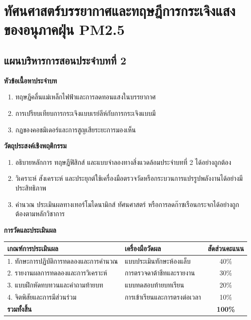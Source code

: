 \chapter{ทัศนศาสตร์บรรยากาศและทฤษฎีการกระเจิงแสงของอนุภาคฝุ่น PM2.5}
\label{chap:ch02}

\section*{แผนบริหารการสอนประจำบทที่ 2}

\noindent\textbf{หัวข้อเนื้อหาประจำบท}
\begin{enumerate}
    \item ทฤษฎีคลื่นแม่เหล็กไฟฟ้าและการลดทอนแสงในบรรยากาศ
    \item การเปรียบเทียบการกระเจิงแบบเรย์ลีห์กับการกระเจิงแบบมี
    \item กฎของคอชมิเดอร์และการสูญเสียระยะการมองเห็น
\end{enumerate}

\noindent\textbf{วัตถุประสงค์เชิงพฤติกรรม}
\begin{enumerate}
    \item อธิบายหลักการ ทฤษฎีฟิสิกส์ และแบบจำลองทางสิ่งแวดล้อมประจำบทที่ 2 ได้อย่างถูกต้อง
    \item วิเคราะห์ สังเคราะห์ และประยุกต์ใช้เครื่องมือตรวจวัดหรือกระบวนการแปรรูปพลังงานได้อย่างมีประสิทธิภาพ
    \item คำนวณ ประเมินผลทางเทอร์โมไดนามิกส์ ทัศนศาสตร์ หรือการลดก๊าซเรือนกระจกได้อย่างถูกต้องตามหลักวิชาการ
\end{enumerate}

\noindent\textbf{การวัดและประเมินผล}
\begin{table}[H]
\centering\small
\begin{tabularx}{\textwidth}{p{} p{} c}
\toprule
\textbf{เกณฑ์การประเมินผล} & \textbf{เครื่องมือวัดผล} & \textbf{สัดส่วนคะแนน} \\
\midrule
1. ทักษะการปฏิบัติการทดลองและการคำนวณ & แบบประเมินทักษะห้องแล็บ & 40\% \\
2. รายงานผลการทดลองและการวิเคราะห์ & การตรวจดาต้าชีทและรายงาน & 30\% \\
3. แบบฝึกหัดทบทวนและคำถามท้ายบท & แบบทดสอบท้ายบทเรียน & 20\% \\
4. จิตพิสัยและการมีส่วนร่วม & การเข้าเรียนและการตรงต่อเวลา & 10\% \\
\midrule
\textbf{รวมทั้งสิ้น} & & \textbf{100\%} \\
\bottomrule
\end{tabularx}
\end{table}
\newpage

